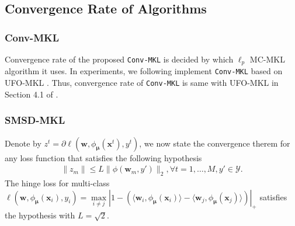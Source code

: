 \documentclass{article}
\begin{document}
\subsection{Convergence Rate of Algorithms}
\subsubsection{Conv-MKL}
Convergence rate of the proposed \texttt{Conv-MKL} is decided by which $\ell_p$ MC-MKL algorithm it uses. 
In experiments, we following implement \texttt{Conv-MKL} based on UFO-MKL \cite{OrabonaL11}. 
Thus, convergence rate of \texttt{Conv-MKL} is same with UFO-MKL in Section 4.1 of \cite{OrabonaL11}.
\subsubsection{SMSD-MKL}
Denote by $z^t=\partial\ell(\mathbf w,\phi_{\bm \mu}(\mathbf{x}^t), y^t)$,
we now state the convergence therem for any loss function that satisfies the following hypothesis
\begin{align}
\label{loss_function_hypothesis}
    \|z_m\| \leq L\|\phi(\mathbf w_m, y')\|_2, \forall t =1,\ldots, M, y' \in \mathcal{Y}.
\end{align}
The hinge loss for multi-class $\ell(\mathbf w,\phi_{\bm \mu}(\mathbf{x}_i), y_i)=
\max\limits_{i \not= j}\left|1-\left(\langle\mathbf w_i, \phi_{\bm \mu}(\mathbf{x}_i)\rangle -\langle\mathbf w_j, \phi_{\bm \mu}(\mathbf{x}_j)\rangle\right)\right|_+$ satisfies the hypothesis with $L=\sqrt{2}$.
\end{document}
